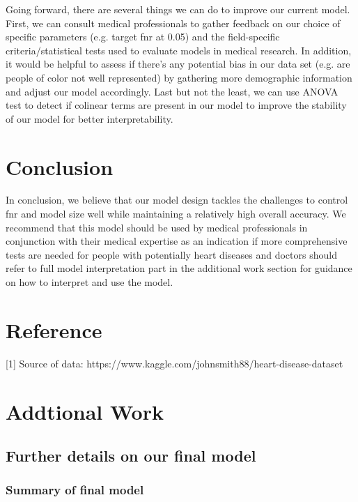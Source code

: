 \documentclass{article}
\begin{document}
Going forward, there are several things we can do to improve our current model.
First, we can consult medical professionals to gather feedback on our choice
of specific parameters (e.g. target fnr at 0.05) and the field-specific
criteria/statistical tests used to evaluate models in medical research.
In addition, it would be helpful to assess if there's any potential bias
in our data set (e.g. are people of color not well represented)
by gathering more demographic information and adjust our model accordingly.
Last but not the least, we can use ANOVA test to detect if colinear terms are
present in our model to improve the stability of our model for better interpretability.\\

\section{Conclusion}
In conclusion, we believe that our model design tackles the challenges to control
fnr and model size well while maintaining a relatively high overall accuracy.
We recommend that this model should be used by medical professionals
in conjunction with their medical expertise as an indication
if more comprehensive tests are needed for people with potentially heart diseases
and doctors should refer to full model interpretation part in the additional work
section for guidance on how to interpret and use the model.\\



\section{Reference}
[1] Source of data: https://www.kaggle.com/johnsmith88/heart-disease-dataset \\



\section{Addtional Work}
\subsection{Further details on our final model}
\subsubsection{Summary of final model}

\\
\end{document}
